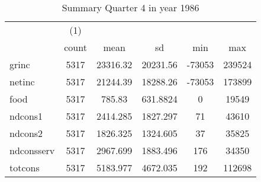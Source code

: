 \begin{table}[htbp]\centering
\def\sym#1{\ifmmode^{#1}\else\(^{#1}\)\fi}
\caption{Summary Quarter 4 in year 1986 \label{sum\_Q4\_y1986}}
\begin{tabular}{l*{1}{ccccc}}
\hline\hline
            &\multicolumn{1}{c}{(1)}&            &            &            &            \\
            &       count&        mean&          sd&         min&         max\\
\hline
grinc       &        5317&    23316.32&    20231.56&      -73053&      239524\\
netinc      &        5317&    21244.39&    18288.26&      -73053&      173899\\
food        &        5317&      785.83&    631.8824&           0&       19549\\
ndcons1     &        5317&    2414.285&    1827.297&          71&       43610\\
ndcons2     &        5317&    1826.325&    1324.605&          37&       35825\\
ndconsserv  &        5317&    2967.699&    1883.496&         176&       34350\\
totcons     &        5317&    5183.977&    4672.035&         192&      112698\\
\hline\hline
\end{tabular}
\end{table}
